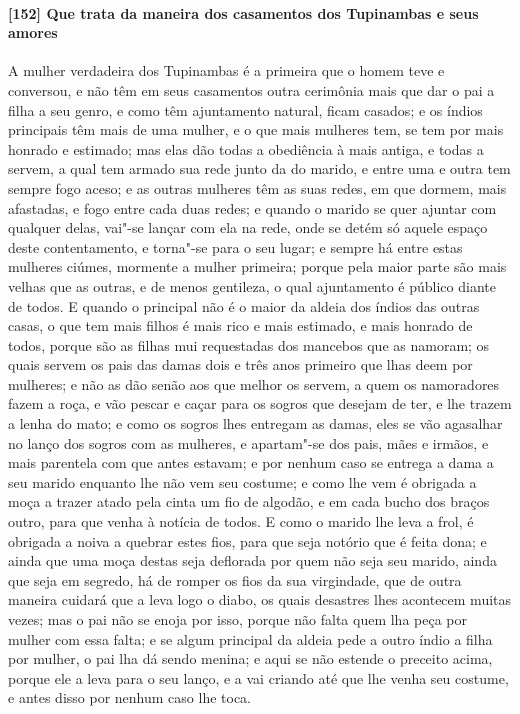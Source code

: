 \begin{linenumbers}
\paragraph{[152] Que trata da maneira dos casamentos dos Tupinambas e seus amores}\quad
A mulher verdadeira dos Tupinambas é a primeira que o homem teve e conversou, e não têm em
seus casamentos outra cerimônia mais que dar o pai a filha a seu genro, e como têm
ajuntamento natural, ficam casados; e os índios principais têm mais de uma mulher, e o que
mais mulheres tem, se tem por mais honrado e estimado; mas elas dão todas a obediência à
mais antiga, e todas a servem, a qual tem armado sua rede junto da do marido, e entre uma
e outra tem sempre fogo aceso; e as outras mulheres têm as suas redes, em que dormem, mais
afastadas, e fogo entre cada duas redes; e quando o marido se quer ajuntar com qualquer
delas, vai"-se lançar com ela na rede, onde se detém só aquele espaço deste contentamento,
e torna"-se para o seu lugar; e sempre há entre estas mulheres ciúmes, mormente a mulher
primeira; porque pela maior parte são mais velhas que as outras, e de menos gentileza, o
qual ajuntamento é público diante de todos. E quando o principal não é o maior da aldeia
dos índios das outras casas, o que tem mais filhos é mais rico e mais estimado, e mais
honrado de todos, porque são as filhas mui requestadas dos mancebos que as namoram; os
quais servem os pais das damas dois e três anos primeiro que lhas deem por mulheres; e não
as dão senão aos que melhor os servem, a quem os namoradores fazem a roça, e vão pescar e
caçar para os sogros que desejam de ter, e lhe trazem a lenha do mato; e como os sogros
lhes entregam as damas, eles se vão agasalhar no lanço dos sogros com as mulheres, e
apartam"-se dos pais, mães e irmãos, e mais parentela com que antes estavam; e por nenhum
caso se entrega a dama a seu marido enquanto lhe não vem seu costume; e como lhe vem é
obrigada a moça a trazer atado pela cinta um fio de algodão, e em cada bucho dos braços
outro, para que venha à notícia de todos. E como o marido lhe leva a frol, é obrigada a
noiva a quebrar estes fios, para que seja notório que é feita dona; e ainda que uma moça
destas seja deflorada por quem não seja seu marido, ainda que seja em segredo, há de
romper os fios da sua virgindade, que de outra maneira cuidará que a leva logo o diabo, os
quais desastres lhes acontecem muitas vezes; mas o pai não se enoja por isso, porque não
falta quem lha peça por mulher com essa falta; e se algum principal da aldeia pede a outro
índio a filha por mulher, o pai lha dá sendo menina; e aqui se não estende o preceito
acima, porque ele a leva para o seu lanço, e a vai criando até que lhe venha seu costume,
e antes disso por nenhum caso lhe toca.


\end{linenumbers}
